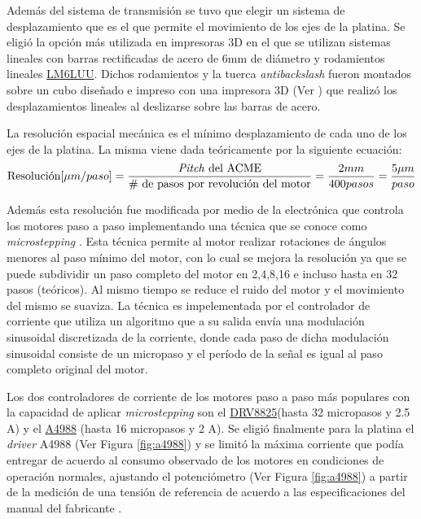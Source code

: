 Además del sistema de transmisión se tuvo que elegir un sistema de desplazamiento que es el que permite el movimiento de los ejes de la platina. Se eligió la opción más utilizada en impresoras 3D en el que se utilizan sistemas lineales con barras rectificadas de acero de 6mm de diámetro y rodamientos lineales \href{https://uk.misumi-ec.com/vona2/detail/221000091678/?HissuCode=LM6LUU}{LM6LUU}. Dichos rodamientos y la tuerca \textit{antibackslash} fueron montados sobre un cubo diseñado e impreso con una impresora 3D (Ver \href{https://github.com/jrr1984/open_frame_XYStage/blob/master/3dprintedparts/STLs/cuboconLM6UU_2demarzo.STL}{\faCubes}) que realizó los desplazamientos lineales al deslizarse sobre las barras de acero.

La resolución espacial mecánica es el mínimo desplazamiento de cada uno de los ejes de la platina. La misma viene dada teóricamente por la siguiente ecuación:
\begin{equation}
\text{Resolución} [\mu m / paso] = \frac{\text{\textit{Pitch} del ACME}}{\text{\# de pasos por revolución del motor}} = \frac{2 mm}{400 pasos} = \frac{5 \mu m}{paso}
\end{equation}

Además esta resolución fue modificada por medio de la electrónica que controla los motores paso a paso implementando una técnica que se conoce como \textit{microstepping} \cite{7806244}. Esta técnica permite al motor realizar rotaciones de ángulos menores al paso mínimo del motor, con lo cual se mejora la resolución ya que se puede subdividir un paso completo del motor en 2,4,8,16 e incluso hasta en 32 pasos (teóricos). Al mismo tiempo se reduce el ruido del motor y el movimiento del mismo se suaviza. La técnica es impelementada por el controlador de corriente que utiliza un algoritmo que a su salida envía una modulación sinusoidal discretizada de la corriente, donde cada paso de dicha modulación sinusoidal consiste de un micropaso y el período de la señal es igual al paso completo original del motor.

Los dos controladores de corriente de los motores paso a paso más populares con la capacidad de aplicar \textit{microstepping} son el \href{https://www.pololu.com/product/2133}{DRV8825}(hasta 32 micropasos y 2.5 A) y el \href{https://www.pololu.com/product/1182}{A4988} (hasta 16 micropasos y 2 A). Se eligió finalmente para la platina el \textit{driver} A4988 (Ver Figura \ref{fig:a4988}) y se limitó la máxima corriente que podía entregar de acuerdo al consumo observado de los motores en condiciones de operación normales, ajustando el potenciómetro (Ver Figura \ref{fig:a4988}) a partir de la medición de una tensión de referencia de acuerdo a las especificaciones del manual del fabricante \cite{a4988}.

